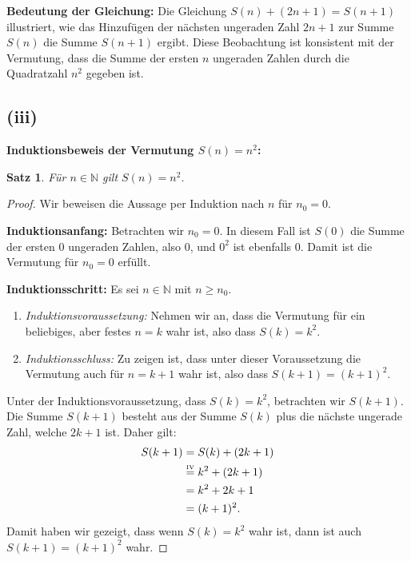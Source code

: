 \documentclass{article}
\newtheorem*{theorem}{Satz}
\begin{document}
\textbf{Bedeutung der Gleichung:}
Die Gleichung \( S(n) + (2n + 1) = S(n + 1) \) illustriert, wie das Hinzufügen der nächsten ungeraden Zahl \( 2n + 1 \) zur Summe \( S(n) \) die Summe \( S(n + 1) \) ergibt. Diese Beobachtung ist konsistent mit der Vermutung, dass die Summe der ersten \( n \) ungeraden Zahlen durch die Quadratzahl \( n^2 \) gegeben ist.


\subsection*{(iii)}

\textbf{Induktionsbeweis der Vermutung \( S(n) = n^2 \):}

\begin{theorem}
	Für \( n \in \mathbb{N} \) gilt \( S(n) = n^2 \).
\end{theorem}

\begin{proof}
	Wir beweisen die Aussage per Induktion nach \( n \) für \( n_0 = 0 \).

	\textbf{Induktionsanfang:}
	Betrachten wir \( n_0 = 0 \). In diesem Fall ist \( S(0) \) die Summe der ersten 0 ungeraden Zahlen, also \( 0 \), und \( 0^2 \) ist ebenfalls \( 0 \). Damit ist die Vermutung für \( n_0 = 0 \) erfüllt.

	\textbf{Induktionsschritt:} Es sei \( n \in \mathbb{N} \) mit \( n \geq n_0 \).
	\begin{enumerate}
		\item \textit{Induktionsvoraussetzung:} Nehmen wir an, dass die Vermutung für ein beliebiges, aber festes \( n = k \) wahr ist, also dass \( S(k) = k^2 \).
		\item \textit{Induktionsschluss:} Zu zeigen ist, dass unter dieser Voraussetzung die Vermutung auch für \( n = k + 1 \) wahr ist, also dass \( S(k + 1) = (k + 1)^2 \).
	\end{enumerate}
	Unter der Induktionsvoraussetzung, dass \( S(k) = k^2 \), betrachten wir \( S(k + 1) \). Die Summe \( S(k + 1) \) besteht aus der Summe \( S(k) \) plus die nächste ungerade Zahl, welche \( 2k + 1 \) ist. Daher gilt:
	\begin{align*}
		S(k + 1) & = S(k) + (2k + 1)                                    \\
		         & \overset{\makebox[0pt]{\tiny{IV}}}{=} k^2 + (2k + 1) \\ %
		         & = k^2 + 2k + 1                                       \\
		         & = (k + 1)^2.
	\end{align*}
	Damit haben wir gezeigt, dass wenn \( S(k) = k^2 \) wahr ist, dann ist auch \\ \( S(k + 1) = (k + 1)^2 \) wahr.
\end{proof}
\end{document}
